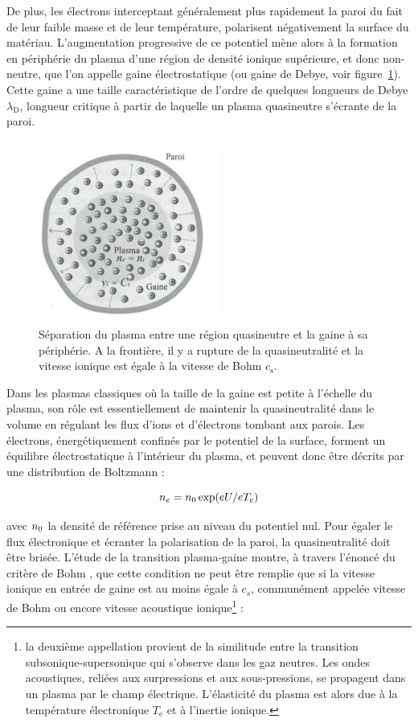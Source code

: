\begin{refsection}
De plus, les électrons interceptant généralement
plus rapidement la paroi du fait de leur faible masse et de leur température,
polarisent négativement la surface du matériau.
L'augmentation progressive de ce potentiel mène alors à la formation en périphérie du plasma d'une région de densité ionique
supérieure, et donc non-neutre, que l'on appelle gaine électrostatique (ou gaine de Debye, voir
figure~\ref{1-gaine1}). Cette gaine a une taille caractéristique de l'ordre de
quelques longueurs de Debye $\lambda_\text{D}$, longueur critique à partir de
laquelle un plasma quasineutre  s'écrante de la paroi.

\begin{figure}[htbp]
\centering
\includegraphics[height=60mm,width=60mm]{figures/1-sheath.jpg}{\caption{Séparation
du plasma entre une région quasineutre et la gaine à sa
périphérie. A la frontière, il y a rupture de la quasineutralité et la vitesse
ionique est égale à la vitesse de Bohm
$c_\text{s}$\parencite{Rax}.}\label{1-gaine1}}
\end{figure}

Dans les plasmas classiques où la taille de la gaine est petite
à l'échelle du plasma, son rôle est essentiellement de
maintenir la quasineutralité dans le volume en régulant les flux d'ions et
d'électrons tombant aux parois. Les électrons, énergétiquement confinés par le
potentiel de la surface, forment un équilibre électrostatique à l'intérieur du
plasma, et peuvent donc être décrits par une distribution de Boltzmann :

\begin{equation}
	n_{e}=n{_{0}}\exp(eU/eT_{e})
\end{equation}

avec $n{_{0}}$ la densité de référence prise au niveau du potentiel nul.
Pour égaler le flux électronique et écranter la polarisation de la paroi, la
quasineutralité doit être brisée. L'étude de la transition plasma-gaine montre,
à travers l'énoncé du critère de Bohm \parencite{Stangeby}, que
cette condition ne peut être remplie que si la vitesse ionique en entrée de
gaine est au moins égale à $c_s$, communément appelée vitesse de Bohm ou encore
vitesse acoustique ionique\footnote{la deuxième appellation provient de la similitude entre la
transition subsonique-supersonique qui s'observe dans les gaz neutres. Les
ondes acoustiques, reliées aux surpressions et aux sous-pressions, se propagent
dans un plasma par le champ électrique. L'élasticité du plasma est alors due à
la température électronique $T_\text{e}$ et à l'inertie ionique.} :


\end{refsection}
